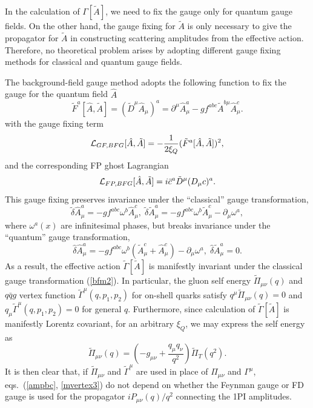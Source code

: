 \documentclass[preprint,amsmath,amssymb,superscriptaddress, floatfix,nofootinbib]{revtex4}
\begin{document}
In the calculation of $\Gamma[\tilde{A}]$, 
we need to fix the gauge only for quantum gauge fields. 
On the other hand, the gauge fixing for $\tilde{A}$ is only necessary to 
give the propagator for $\tilde{A}$ in constructing 
scattering amplitudes from the effective action. 
Therefore, no theoretical problem arises by adopting different 
gauge fixing methods for classical and quantum gauge fields. 

The background-field gauge method adopts the following 
function to fix the gauge for the quantum field $\hat{A}$ 
%
\begin{equation}
\tilde{F}^a[\hat{A}, \tilde{A}] = (\tilde{D}^{\mu}\hat{A}_{\mu})^a 
= \partial^{\mu}\hat{A}^a_{\mu} -g f^{abc}\tilde{A}^{b\mu}\hat{A}^c_{\mu} .
\label{bfm1} 
\end{equation}
%
with the gauge fixing term  
%
\begin{equation}
{\cal L}_{GF,BFG}[\hat{A}, \tilde{A}]
= -\frac{1}{2\xi_Q} (\tilde{F}^a[\hat{A}, \tilde{A}] )^2 ,
\label{bfm1b} 
\end{equation}
%
and the corresponding FP ghost Lagrangian 
%
\begin{equation}
{\cal L}_{FP,BFG}[\hat{A}, \tilde{A}] = 
i\bar{c}^a\tilde{D}^{\mu} (D_{\mu} c)^a .
\label{bfm1c}
\end{equation}
% 
This gauge fixing preserves invariance under the ``classical''
gauge transformation, 
\begin{equation}
\tilde{\delta} \hat{A}^a_{\mu} = -g f^{abc}\omega^b \hat{A}^c_{\mu}, \; 
\tilde{\delta}\tilde{A}^a_{\mu} = -g f^{abc}\omega^b \tilde{A}^c_{\mu} 
-\partial_{\mu} \omega^a , 
\label{bfm2}
\end{equation}
where $\omega^a(x)$ are infinitesimal phases, 
but breaks invariance under the ``quantum'' gauge transformation, 
\begin{equation}
\hat{\delta} \hat{A}^a_{\mu} =  -g f^{abc}\omega^b (\tilde{A}^c_{\mu}+\hat{A}^c_{\mu})  
-\partial_{\mu} \omega^a, \; 
\hat{\delta}\tilde{A}^a_{\mu} = 0.
\label{bfm3} 
\end{equation}
As a result, the effective action $\tilde{\Gamma}[\tilde{A}]$ is  
manifestly invariant under the classical gauge transformation (\ref{bfm2}).  
In particular, the gluon self energy $\tilde{\Pi}_{\mu\nu}(q)$ and 
$q\bar{q}g$ vertex function $\tilde{\Gamma}^{\mu}(q,p_1,p_2)$ for on-shell quarks 
satisfy $q^{\mu}\tilde{\Pi}_{\mu\nu}(q)=0$ and 
$q_{\mu}\tilde{\Gamma}^{\mu}(q,p_1,p_2)=0$ for general $q$. 
Furthermore, since 
calculation of $\tilde{\Gamma}[\tilde{A}]$ is manifestly 
Lorentz covariant, for an arbitrary $\xi_Q$, 
we may express the self energy as 
%
\begin{equation}
\tilde{\Pi}_{\mu\nu}(q) = \left( -g_{\mu\nu} + \frac{ q_{\mu}q_{\nu} }{q^2} \right) 
\tilde{\Pi}_T(q^2)  .
\label{bfm4}
\end{equation}
%
It is then clear that, if $\tilde{\Pi}_{\mu\nu}$ and $\tilde{\Gamma}^{\mu}$ are 
used in place of $\Pi_{\mu\nu}$ and $\Gamma^{\mu}$, 
eqs.~(\ref{ampbc}, \ref{mvertex3}) do not depend on whether the Feynman gauge or 
FD gauge is used for the propagator $iP_{\mu\nu}(q)/q^2$ 
connecting the 1PI amplitudes. 
\end{document}

